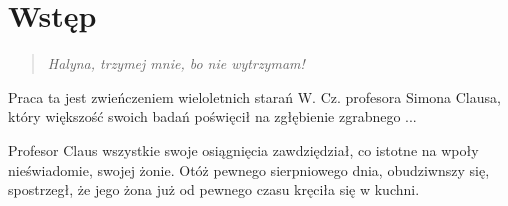 \chapter{Wstęp}
\begin{quote}
    \itshape
    Halyna, trzymej mnie, bo nie wytrzymam!

\end{quote}


Praca ta jest zwieńczeniem wieloletnich starań W. Cz. profesora Simona Clausa, który większość swoich badań poświęcił na zgłębienie zgrabnego ... 


Profesor Claus wszystkie swoje osiągnięcia zawdziędział, co istotne na wpoły nieświadomie, swojej żonie. Otóż pewnego sierpniowego dnia, obudziwnszy się, spostrzegł, że jego żona już od pewnego czasu kręciła się w kuchni.
